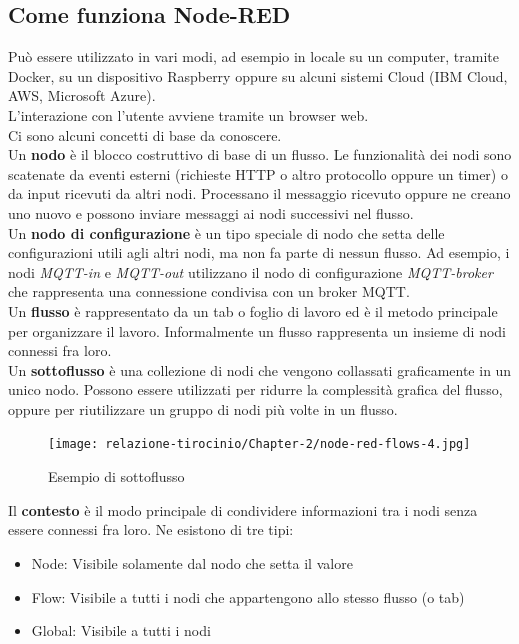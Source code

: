 \documentclass[a4paper,10pt]{memoir}
\begin{document}
\subsection{Come funziona Node-RED}
Può essere utilizzato in vari modi, ad esempio in locale su un computer, tramite Docker, su un dispositivo Raspberry oppure su alcuni sistemi Cloud (IBM Cloud, AWS, Microsoft Azure).
\\
L'interazione con l'utente avviene tramite un browser web. 
\\
Ci sono alcuni concetti di base da conoscere.
\\
Un \textbf{nodo} è il blocco costruttivo di base di un flusso. Le funzionalità dei nodi sono scatenate da eventi esterni (richieste HTTP o altro protocollo oppure un timer) o da input ricevuti da altri nodi. Processano il messaggio ricevuto oppure ne creano uno nuovo e possono inviare messaggi ai nodi successivi nel flusso. 
\\
Un \textbf{nodo di configurazione} è un tipo speciale di nodo che setta delle configurazioni utili agli altri nodi, ma non fa parte di nessun flusso. Ad esempio, i nodi \textit{MQTT-in} e \textit{MQTT-out} utilizzano il nodo di configurazione \textit{MQTT-broker} che rappresenta una connessione condivisa con un broker MQTT.
\\
Un \textbf{flusso} è rappresentato da un tab o foglio di lavoro ed è il metodo principale per organizzare il lavoro. Informalmente un flusso rappresenta un insieme di nodi connessi fra loro.
\\
Un \textbf{sottoflusso} è una collezione di nodi che vengono collassati graficamente in un unico nodo. Possono essere utilizzati per ridurre la complessità grafica del flusso, oppure per riutilizzare un gruppo di nodi più volte in un flusso.
\begin{figure}[H]
\caption{Esempio di sottoflusso}
\label{fig:sottoflusso}
\texttt{[image: relazione-tirocinio/Chapter-2/node-red-flows-4.jpg]}
\end{figure}
Il \textbf{contesto} è il modo principale di condividere informazioni tra i nodi senza essere connessi fra loro. Ne esistono di tre tipi:
\begin{itemize}
    \item Node: Visibile solamente dal nodo che setta il valore
    \item Flow: Visibile a tutti i nodi che appartengono allo stesso flusso (o tab)
    \item Global: Visibile a tutti i nodi
\end{itemize}
\end{document}
